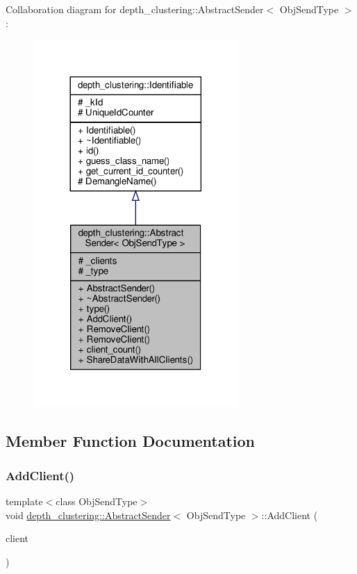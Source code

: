 Collaboration diagram for depth\+\_\+clustering\+:\+:Abstract\+Sender$<$ Obj\+Send\+Type $>$\+:\nopagebreak
\begin{figure}[H]
\begin{center}
\leavevmode
\includegraphics[width=221pt]{classdepth__clustering_1_1AbstractSender__coll__graph}
\end{center}
\end{figure}


\subsection{Member Function Documentation}
\mbox{\label{classdepth__clustering_1_1AbstractSender_aca33c29cca1916fb0a3edd9024a49b51}} 
\subsubsection{\texorpdfstring{Add\+Client()}{AddClient()}}
{\footnotesize\ttfamily template$<$class Obj\+Send\+Type$>$ \\
void \hyperlink{classdepth__clustering_1_1AbstractSender}{depth\+\_\+clustering\+::\+Abstract\+Sender}$<$ Obj\+Send\+Type $>$\+::Add\+Client (\begin{DoxyParamCaption}\item[{\hyperlink{classdepth__clustering_1_1AbstractClient}{Abstract\+Client}$<$ Obj\+Send\+Type $>$ $\ast$}]{client }\end{DoxyParamCaption})\hspace{0.3cm}{\ttfamily [inline]}}



